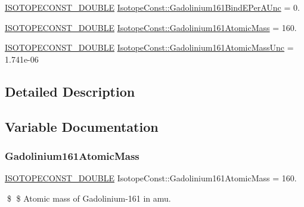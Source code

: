 \begin{DoxyCompactItemize}
\item 
\mbox{\hyperlink{group___isotope_const-_macros_ga8f45a7272ce02c0b4c65c44636ed719a}{I\+S\+O\+T\+O\+P\+E\+C\+O\+N\+S\+T\+\_\+\+D\+O\+U\+B\+LE}} \mbox{\hyperlink{group___isotope_const-_gadolinium-_gd161_ga0f8811d6aaeea46109599962eb86faa8}{Isotope\+Const\+::\+Gadolinium161\+Bind\+E\+Per\+A\+Unc}} = 0.
\item 
\mbox{\hyperlink{group___isotope_const-_macros_ga8f45a7272ce02c0b4c65c44636ed719a}{I\+S\+O\+T\+O\+P\+E\+C\+O\+N\+S\+T\+\_\+\+D\+O\+U\+B\+LE}} \mbox{\hyperlink{group___isotope_const-_gadolinium-_gd161_ga78627403d927b39fdc288a52e30bbfc5}{Isotope\+Const\+::\+Gadolinium161\+Atomic\+Mass}} = 160.
\item 
\mbox{\hyperlink{group___isotope_const-_macros_ga8f45a7272ce02c0b4c65c44636ed719a}{I\+S\+O\+T\+O\+P\+E\+C\+O\+N\+S\+T\+\_\+\+D\+O\+U\+B\+LE}} \mbox{\hyperlink{group___isotope_const-_gadolinium-_gd161_ga4cf7fb85da8a0c470018d6e36ab56cb5}{Isotope\+Const\+::\+Gadolinium161\+Atomic\+Mass\+Unc}} = 1.\+741e-\/06
\end{DoxyCompactItemize}


\subsection{Detailed Description}


\subsection{Variable Documentation}
\mbox{\label{group___isotope_const-_gadolinium-_gd161_ga78627403d927b39fdc288a52e30bbfc5}} 
\subsubsection{\texorpdfstring{Gadolinium161\+Atomic\+Mass}{Gadolinium161AtomicMass}}
{\footnotesize\ttfamily \mbox{\hyperlink{group___isotope_const-_macros_ga8f45a7272ce02c0b4c65c44636ed719a}{I\+S\+O\+T\+O\+P\+E\+C\+O\+N\+S\+T\+\_\+\+D\+O\+U\+B\+LE}} Isotope\+Const\+::\+Gadolinium161\+Atomic\+Mass = 160.}

\$ \$ Atomic mass of Gadolinium-\/161 in amu. \mbox{\label{group___isotope_const-_gadolinium-_gd161_ga4cf7fb85da8a0c470018d6e36ab56cb5}} 
